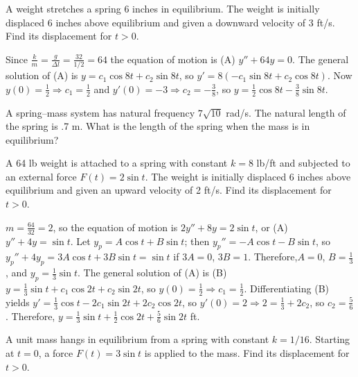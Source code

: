 \documentclass{ximera}
\begin{document}
\begin{problem}\label{exer:6.1.8}
A weight stretches a spring 6 inches in equilibrium. The weight is
initially displaced 6 inches above equilibrium and given a downward
velocity of 3 ft/s. Find its displacement for $t>0$.

\begin{solution}
Since $\frac{k}{m}=\frac{g}{\Delta l}=\frac{32}{1/2}=64$ the
equation of motion is (A) $y''+64y=0$. The general solution of (A) is
$y=c_1\cos8t+c_2\sin8t$, so $y'=8(-c_1\sin8t+c_2\cos8t)$. Now
$y(0)=\frac{1}{2}\Rightarrow c_1=\frac{1}{2}$ and
$y'(0)=-3\Rightarrow c_2=-\frac{3}{8}$, so
$y=\frac{1}{2}\cos8t-\frac{3}{8}\sin 8t$.
\end{solution}
\end{problem}

\begin{problem}\label{exer:6.1.9}
A spring--mass system has natural frequency $7\sqrt{10}$ rad/s. The
natural length of the spring is .7 m. What is the length of the spring
when the mass is in equilibrium?
\end{problem}

\begin{problem}\label{exer:6.1.10}
A 64 lb weight is attached to a spring with constant $k=8$ lb/ft and
subjected to an external force $F(t)=2\sin t$. The weight is initially
displaced 6 inches above equilibrium and given an upward velocity of 2
ft/s. Find its displacement for $t>0$.

\begin{solution}
$m=\frac{64}{32}=2$, so the equation of motion is $2y''+8y=2\sin t$,
or (A) $y''+4y=\sin t$. Let $y_p=A\cos t+B\sin t$; then $y_p''=-A\cos
t-B\sin t$, so $y_p''+4y_p=3A\cos t+3B\sin t= \sin t$ if $3A=0$,
$3B=1$. Therefore,$A=0$, $B=\frac{1}{3}$, and $y_p=\frac{1}{3}\sin
t$. The general solution of (A) is (B) $y=\frac{1}{3}\sin
t+c_1\cos2t+c_2\sin2t$, so $y(0)=\frac{1}{2}\Rightarrow
c_1=\frac{1}{2}$. Differentiating (B) yields $y'=\frac{1}{3}\cos
t-2c_1\sin2t+2c_2\cos2t$, so $y'(0)=2\Rightarrow
2=\frac{1}{3}+2c_2$, so $c_2=\frac{5}{6}$. Therefore,
$y=\frac{1}{3}\sin t+\frac{1}{2}\cos2t+\frac{5}{6}\sin2t$ ft.
\end{solution}
\end{problem}

\begin{problem}\label{exer:6.1.11}
A unit mass hangs in equilibrium from a spring with constant $k=1/16$.
Starting at $t=0$, a force $F(t)=3\sin t$ is applied to the mass. Find
its displacement for $t>0$.
\end{problem}
\end{document}
